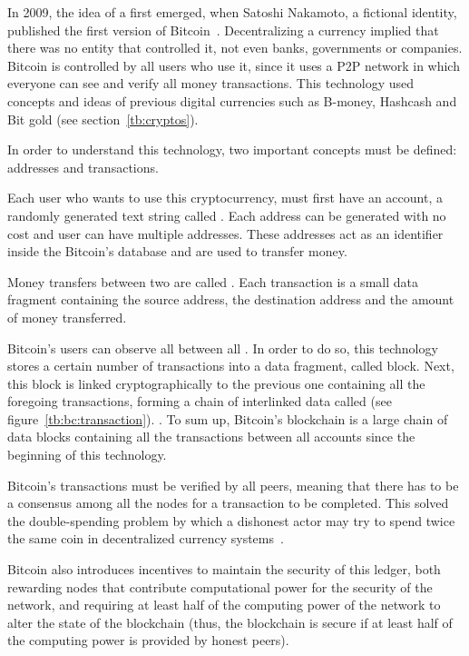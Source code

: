In 2009, the idea of a  first emerged, when
Satoshi Nakamoto, a fictional identity, published the first version of
Bitcoin~\cite{nakamoto2008bitcoin}. Decentralizing a currency implied that there
was no entity that controlled it, not even banks, governments or companies.
Bitcoin is controlled by all users who use it, since it uses a P2P network in
which everyone can see and verify all money transactions. This technology used
concepts and ideas of previous digital currencies such as B-money, Hashcash and
Bit gold (see section~\ref{tb:cryptos}).

In order to understand this technology, two important concepts must be defined:
addresses and transactions.

Each user who wants to use this cryptocurrency, must first have an account, a
randomly generated text string called . Each address can be
generated with no cost and user can have multiple addresses. These addresses act
as an identifier inside the Bitcoin's database and are used to transfer money.

Money transfers between two  are called . Each
transaction is a small data fragment containing the source address, the
destination address and the amount of money transferred.

Bitcoin's users can observe all  between all . In
order to do so, this technology stores a certain number of transactions into a
data fragment, called block. Next, this block is linked cryptographically to the
previous one containing all the foregoing transactions, forming a chain of
interlinked data called  (see figure~\ref{tb:bc:transaction}). .
To sum up, Bitcoin's blockchain is a large chain of data blocks containing all
the transactions between all accounts since the beginning of this technology.

Bitcoin's transactions must be verified by all peers, meaning that there has to
be a consensus among all the nodes for a transaction to be completed. This
solved the double-spending problem by which a dishonest actor may try to spend
twice the same coin in decentralized currency systems~\cite{chohan2017double}.

Bitcoin also introduces incentives to maintain the security of this ledger, both
rewarding nodes that contribute computational power for the security of the
network, and requiring at least half of the computing power of the network to
alter the state of the blockchain (thus, the blockchain is secure if at least
half of the computing power is provided by honest peers).

